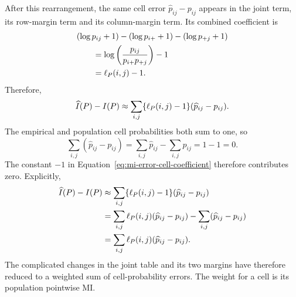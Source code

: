 After this rearrangement, the same cell error \(\widehat p_{ij}-p_{ij}\)
appears in the joint term, its
row-margin term and its column-margin term. Its combined coefficient is
\begin{align}
  &(\log p_{ij}+1)
  -(\log p_{i+}+1)
  -(\log p_{+j}+1)
  \notag\\
  &\qquad
  =\log\left(\frac{p_{ij}}{p_{i+}p_{+j}}\right)-1
  \notag\\
  &\qquad
  =\ell_P(i,j)-1.
  \label{eq:mi-error-cell-coefficient}
\end{align}
Therefore,
\begin{equation}
  \widehat I(P)-I(P)
  \approx
  \sum_{i,j}\{\ell_P(i,j)-1\}(\widehat p_{ij}-p_{ij}).
  \label{eq:mi-error-before-constant-cancellation}
\end{equation}
The empirical and population cell probabilities both sum to one, so
\begin{equation}
  \sum_{i,j}(\widehat p_{ij}-p_{ij})
  =\sum_{i,j}\widehat p_{ij}-\sum_{i,j}p_{ij}
  =1-1=0.
  \label{eq:cell-errors-sum-zero}
\end{equation}
The constant \(-1\) in Equation~\eqref{eq:mi-error-cell-coefficient} therefore
contributes zero. Explicitly,
\begin{align}
  \widehat I(P)-I(P)
  &\approx
  \sum_{i,j}\{\ell_P(i,j)-1\}(\widehat p_{ij}-p_{ij})
  \notag\\
  &=\sum_{i,j}\ell_P(i,j)(\widehat p_{ij}-p_{ij})
    -\sum_{i,j}(\widehat p_{ij}-p_{ij})
  \notag\\
  &=\sum_{i,j}
  \ell_P(i,j)(\widehat p_{ij}-p_{ij}).
  \label{eq:mi-error-from-cell-errors}
\end{align}
The complicated changes in the joint table and its two margins have therefore
reduced to a weighted sum of cell-probability errors. The weight for a cell is
its population pointwise MI.

\medskip
{}

